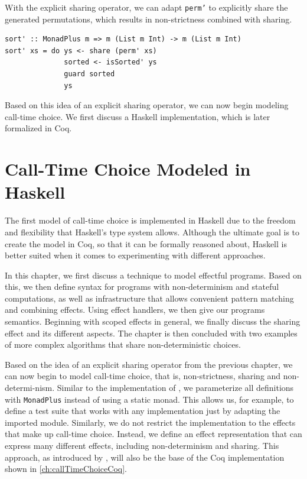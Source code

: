 \documentclass[a4paper, 11pt, fleqn, twoside, abstract=on]{scrreprt}
\newcommand{\hinl}[1]{\texttt{#1}}
\begin{document}
With the explicit sharing operator, we can adapt \hinl{perm'} to explicitly share the generated permutations, which results in non-strictness combined with sharing.

\begin{verbatim}
sort' :: MonadPlus m => m (List m Int) -> m (List m Int)
sort' xs = do ys <- share (perm' xs)
              sorted <- isSorted' ys
              guard sorted
              ys
\end{verbatim}

Based on this idea of an explicit sharing operator, we can now begin modeling call-time choice.
We first discuss a Haskell implementation, which is later formalized in Coq.

\chapter{Call-Time Choice Modeled in Haskell}
\label{ch:callTimeChoiceHaskell}
The first model of call-time choice is implemented in Haskell due to the freedom and flexibility that Haskell's type system allows.
Although the ultimate goal is to create the model in Coq, so that it can be formally reasoned about, Haskell is better suited when it comes to experimenting with different approaches.

In this chapter, we first discuss a technique to model effectful programs.
Based on this, we then define syntax for programs with non-determinism and stateful computations, as well as infrastructure that allows convenient pattern matching and combining effects.
Using effect handlers, we then give our programs semantics.
Beginning with scoped effects in general, we finally discuss the sharing effect and its different aspects.
The chapter is then concluded with two examples of more complex algorithms that share non-deterministic choices.

Based on the idea of an explicit sharing operator from the previous chapter, we can now begin to model call-time choice, that is, non-strictness, sharing and non-determi-nism.
Similar to the implementation of \citet{fischer2009purely}, we parameterize all definitions with \hinl{MonadPlus} instead of using a static monad.
This allows us, for example, to define a test suite that works with any implementation just by adapting the imported module.
Similarly, we do not restrict the implementation to the effects that make up call-time choice.
Instead, we define an effect representation that can express many different effects, including non-determinism and sharing.
This approach, as introduced by \citet{wu2014effect}, will also be the base of the Coq implementation shown in \autoref{ch:callTimeChoiceCoq}.
\end{document}

